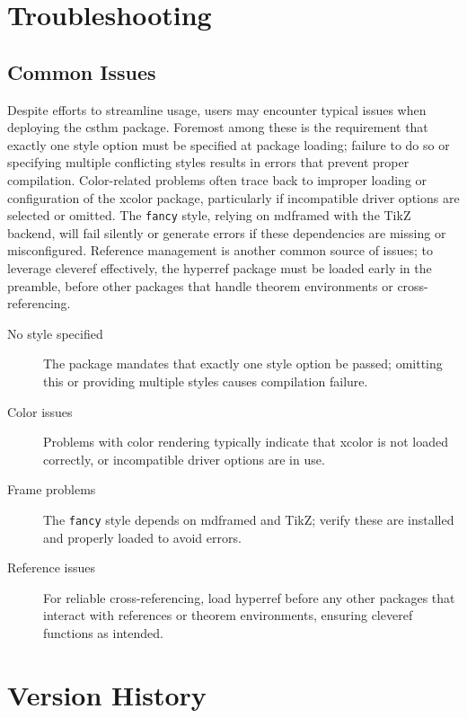 \documentclass[10pt,letterpaper]{amsart}
\begin{document}
\section{Troubleshooting}

\subsection{Common Issues}

Despite efforts to streamline usage, users may encounter typical issues when
deploying the \textsf{csthm} package. Foremost among these is the requirement
that exactly one style option must be specified at package loading; failure to
do so or specifying multiple conflicting styles results in errors that prevent
proper compilation. Color-related problems often trace back to improper loading
or configuration of the \textsf{xcolor} package, particularly if incompatible
driver options are selected or omitted. The \texttt{fancy} style, relying on
\textsf{mdframed} with the \textsf{TikZ} backend, will fail silently or
generate errors if these dependencies are missing or misconfigured. Reference
management is another common source of issues; to leverage \textsf{cleveref}
effectively, the \textsf{hyperref} package must be loaded early in the
preamble, before other packages that handle theorem environments or
cross-referencing.

\begin{description}
	\item[No style specified] The package mandates that exactly one style option be
	      passed; omitting this or providing multiple styles causes compilation failure.
	\item[Color issues] Problems with color rendering typically indicate that
	      \textsf{xcolor} is not loaded correctly, or incompatible driver options are in
	      use.
	\item[Frame problems] The \texttt{fancy} style depends on \textsf{mdframed} and
	      \textsf{TikZ}; verify these are installed and properly loaded to avoid errors.
	\item[Reference issues] For reliable cross-referencing, load \textsf{hyperref} before
	      any other packages that interact with references or theorem environments,
	      ensuring \textsf{cleveref} functions as intended.
\end{description}

\section{Version History}
\end{document}
